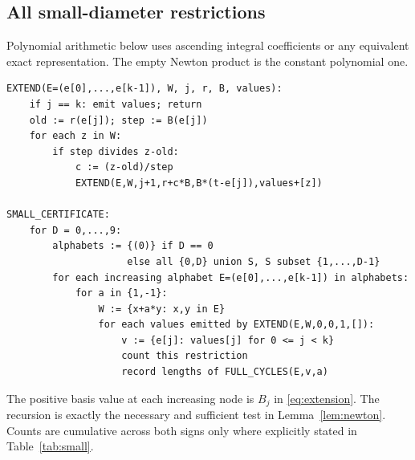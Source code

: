 \subsection{All small-diameter restrictions}
Polynomial arithmetic below uses ascending integral coefficients
or any equivalent exact representation. The empty Newton product
is the constant polynomial one.
\begin{Verbatim}[fontsize=\small]
EXTEND(E=(e[0],...,e[k-1]), W, j, r, B, values):
    if j == k: emit values; return
    old := r(e[j]); step := B(e[j])
    for each z in W:
        if step divides z-old:
            c := (z-old)/step
            EXTEND(E,W,j+1,r+c*B,B*(t-e[j]),values+[z])

SMALL_CERTIFICATE:
    for D = 0,...,9:
        alphabets := {(0)} if D == 0
                     else all {0,D} union S, S subset {1,...,D-1}
        for each increasing alphabet E=(e[0],...,e[k-1]) in alphabets:
            for a in {1,-1}:
                W := {x+a*y: x,y in E}
                for each values emitted by EXTEND(E,W,0,0,1,[]):
                    v := {e[j]: values[j] for 0 <= j < k}
                    count this restriction
                    record lengths of FULL_CYCLES(E,v,a)
\end{Verbatim}
The positive basis value at each increasing node is $B_j$ in
\eqref{eq:extension}. The recursion is exactly the necessary and
sufficient test in Lemma~\ref{lem:newton}. Counts are cumulative
across both signs only where explicitly stated in Table~\ref{tab:small}.

